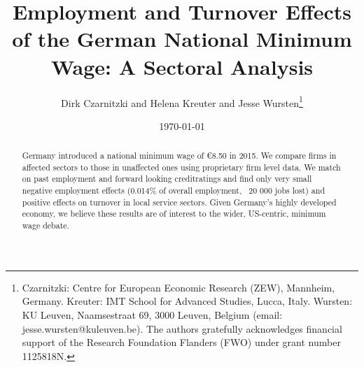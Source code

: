 \documentclass[AER,draftmode]{AEA}
\begin{document}
\title{Employment and Turnover Effects of the German National Minimum Wage: A Sectoral Analysis}
\author{Dirk Czarnitzki and Helena Kreuter and Jesse Wursten\thanks{Czarnitzki: Centre for European Economic Research (ZEW), Mannheim, Germany. Kreuter: IMT School for Advanced Studies, Lucca, Italy. Wursten: KU Leuven, Naamsestraat 69, 3000 Leuven, Belgium (email: jesse.wursten@kuleuven.be). The authors gratefully acknowledges financial support of the Research Foundation Flanders (FWO) under grant number 1125818N.}}
\date{\today}
\pubMonth{}
\pubYear{}

\begin{abstract}
Germany introduced a national minimum wage of €8.50 in 2015. We compare firms in affected sectors to those in unaffected ones using proprietary firm level data. We match on past employment and forward looking creditratings and find only very small negative employment effects (0.014\% of overall employment, ~20 000 jobs lost) and positive effects on turnover in local service sectors. Given Germany's highly developed economy, we believe these results are of interest to the wider, US-centric, minimum wage debate.
\end{abstract}


\maketitle

%

%
%










\appendix

\end{document}
